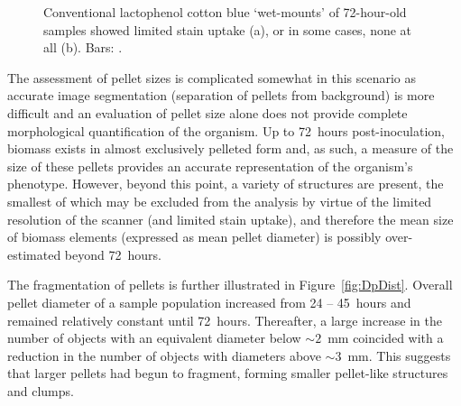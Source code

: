\begin{figure}[bt]
	\centering
	\hspace{0.5cm}
  \caption{Conventional lactophenol cotton blue \lq wet-mounts' of 72-hour-old samples showed limited stain uptake (a), or in some cases, none at all (b). Bars: .}
  \label{fig:LPCBWetStain}
\end{figure}

The assessment of pellet sizes is complicated somewhat in this scenario as accurate image segmentation (separation of pellets from background) is more difficult and an evaluation of pellet size alone does not provide complete morphological quantification of the organism. Up to 72~hours post-inoculation, biomass exists in almost exclusively pelleted form and, as such, a measure of the size of these pellets provides an accurate representation of the organism's phenotype. However, beyond this point, a variety of structures are present, the smallest of which may be excluded from the analysis by virtue of the limited resolution of the scanner (and limited stain uptake), and therefore the mean size of biomass elements (expressed as mean pellet diameter) is possibly over-estimated beyond 72~hours.

The fragmentation of pellets is further illustrated in Figure~\ref{fig:DpDist}. Overall pellet diameter of a sample population increased from 24 -- 45~hours and remained relatively constant until 72~hours. Thereafter, a large increase in the number of objects with an equivalent diameter below $\sim 2$~mm coincided with a reduction in the number of objects with diameters above $\sim 3$~mm. This suggests that larger pellets had begun to fragment, forming smaller pellet-like structures and clumps.

